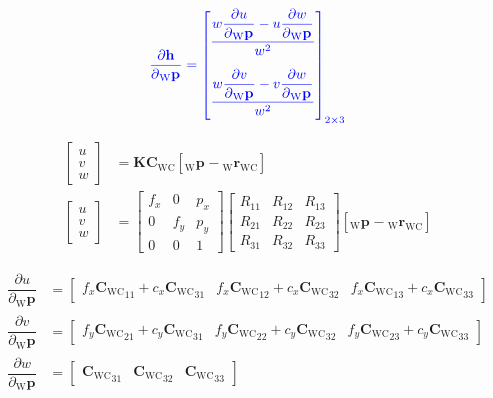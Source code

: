 \documentclass{article}
\renewcommand{\Vec}[1]{{\mathbf{#1}}}
\newcommand{\Mat}[1]{{\mathbf{#1}}}
\newcommand{\cam}{{\text{C}}}
\newcommand{\world}{{\text{W}}}
\newcommand{\KineNotationTransform}[3]{{{#1}_{#2#3}}}
\newcommand{\KineNotation}[3]{{{{}_{#2}} {#1}_{#2#3}}}
\newcommand{\KineNotationPart}[3]{{{{}_{#2}} {#1}_{#3}}}
\newcommand{\pos}{{\Vec{r}}}
\newcommand{\Pos}[2]{{\KineNotation{\pos}{#1}{#2}}}
\newcommand{\rot}{{\Mat{C}}}
\newcommand{\Rot}[2]{{\KineNotationTransform{\rot}{#1}{#2}}}
\newcommand{\point}{\Vec{p}}
\newcommand{\Pt}[1]{{\KineNotationPart{\point}{#1}{}}}
\newcommand{\camRot}{{\Rot{\world}{\cam}}}
\newcommand{\camPos}{{\Pos{\world}{\cam}}}
\newcommand{\projFunc}{{\Vec{h}}}
\begin{document}
\begin{align}
  \color{blue}
  \dfrac{\partial{\projFunc}}{\partial{\Pt{\world}}} =
  \begin{bmatrix}
    \dfrac{
      w \dfrac{\partial{u}}{\partial{\Pt{\world}}} -
      u \dfrac{\partial{w}}{\partial{\Pt{\world}}}
    }{w^{2}} \vspace{1.0em} \\
    \dfrac{
      w \dfrac{\partial{v}}{\partial{\Pt{\world}}} -
      v \dfrac{\partial{w}}{\partial{\Pt{\world}}}
    }{w^{2}} \vspace{0.5em}
  \end{bmatrix}_{2 \times 3}
\end{align}

\begin{align}
  \begin{bmatrix} u \\ v \\ w \end{bmatrix}
    &= \Mat{K} \camRot [\Pt{\world} - \camPos]
    \nonumber \\
  \begin{bmatrix} u \\ v \\ w \end{bmatrix}
  &= \begin{bmatrix}
      f_x & 0 & p_x \\
      0 & f_y & p_y \\
      0 & 0 & 1
  \end{bmatrix}
  \begin{bmatrix}
      R_{11} & R_{12} & R_{13} \\
      R_{21} & R_{22} & R_{23} \\
      R_{31} & R_{32} & R_{33}
  \end{bmatrix}
  [\Pt{\world} - \camPos]
  \nonumber
\end{align}

\begin{align}
  \dfrac{\partial{u}}{\partial{\Pt{\world}}} &=
    \begin{bmatrix}
      f_{x} \camRot_{11} + c_{x} \camRot_{31} &
      f_{x} \camRot_{12} + c_{x} \camRot_{32} &
      f_{x} \camRot_{13} + c_{x} \camRot_{33}
    \end{bmatrix} \\
  \dfrac{\partial{v}}{\partial{\Pt{\world}}} &=
    \begin{bmatrix}
      f_{y} \camRot_{21} + c_{y} \camRot_{31} &
      f_{y} \camRot_{22} + c_{y} \camRot_{32} &
      f_{y} \camRot_{23} + c_{y} \camRot_{33}
    \end{bmatrix} \\
  \dfrac{\partial{w}}{\partial{\Pt{\world}}} &=
    \begin{bmatrix}
      \camRot_{31} &
      \camRot_{32} &
      \camRot_{33}
    \end{bmatrix}
\end{align}
\end{document}
